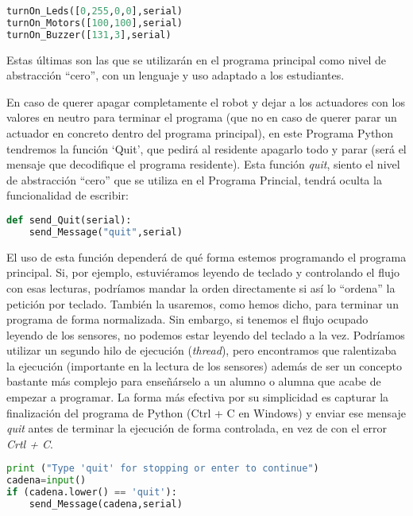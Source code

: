 \begin{lstlisting}[language=python,caption={Uso de los actuadores desde el Programa Principal}]
turnOn_Leds([0,255,0,0],serial)
turnOn_Motors([100,100],serial)
turnOn_Buzzer([131,3],serial)
\end{lstlisting}

Estas últimas son las que se utilizarán en el programa principal como nivel de abstracción ``cero'', con un lenguaje y uso adaptado a los estudiantes.\\

\par En caso de querer apagar completamente el robot y dejar a los actuadores con los valores en neutro para terminar el programa (que no en caso de querer parar un actuador en concreto dentro del programa principal), en este Programa Python tendremos la función `Quit', que pedirá al residente apagarlo todo y parar (será el mensaje que decodifique el programa residente). Esta función \textit{quit}, siento el nivel de abstracción ``cero'' que se utiliza en el Programa Princial, tendrá oculta la funcionalidad de escribir:

\begin{lstlisting}[language=python,caption={Mensaje \textit{terminate} para los actuadores}]
def send_Quit(serial):
	send_Message("quit",serial)
\end{lstlisting}

El uso de esta función dependerá de qué forma estemos programando el programa principal. Si, por ejemplo, estuviéramos leyendo de teclado y controlando el flujo con esas lecturas, podríamos mandar la orden directamente si así lo ``ordena'' la petición por teclado. También la usaremos, como hemos dicho, para terminar un programa de forma normalizada. Sin embargo, si tenemos el flujo ocupado leyendo de los sensores, no podemos estar leyendo del teclado a la vez. Podríamos utilizar un segundo hilo de ejecución (\textit{thread}), pero encontramos que ralentizaba la ejecución (importante en la lectura de los sensores) además de ser un concepto bastante más complejo para enseñárselo a un alumno o alumna que acabe de empezar a programar. La forma más efectiva por su simplicidad es capturar la finalización del programa de Python (Ctrl + C en Windows) y enviar ese mensaje \textit{quit} antes de terminar la ejecución de forma controlada, en vez de con el error \textit{Crtl + C}. \\

\begin{lstlisting}[language=python,caption={Ejemplo de finalización de programa con control de flujo}]
print ("Type 'quit' for stopping or enter to continue")
cadena=input()
if (cadena.lower() == 'quit'):
	send_Message(cadena,serial)
	
\end{lstlisting}


